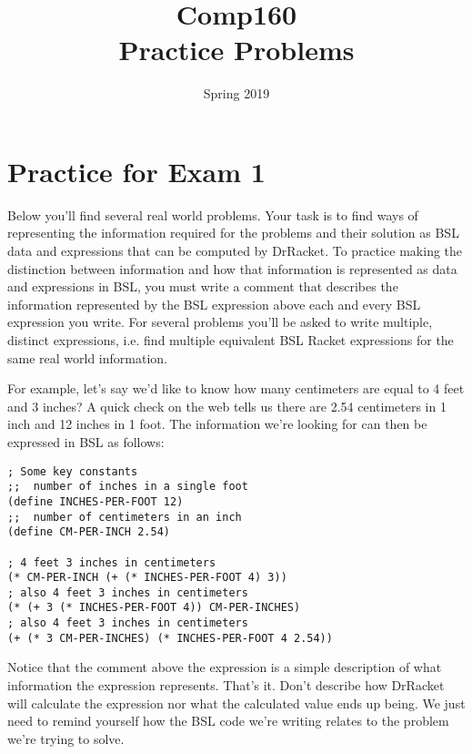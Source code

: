 \documentclass[nobib]{tufte-handout}
\title{Comp160 \\ Practice Problems }
\author{}
\date{ Spring 2019 }
\begin{document}
\maketitle


\section{Practice for Exam 1}

Below you'll find several real world problems. Your task is to find ways of representing the information required for the problems and their solution as BSL data and expressions that can be computed by DrRacket. To practice making the distinction between information and how that information is represented as data and expressions in BSL, you must write a comment that describes the information represented by the BSL expression above each and every BSL expression you write.  For several problems you'll be asked to write multiple, distinct expressions, i.e. find multiple equivalent BSL Racket expressions for the same real world information.

For example, let's say we'd like to know how many centimeters are equal to 4 feet and 3 inches?  A quick check on the web tells us there are 2.54 centimeters in 1 inch and 12 inches in 1 foot.  The information we're looking for can then be expressed in BSL as follows:

\begin{lstlisting}
; Some key constants
;;  number of inches in a single foot
(define INCHES-PER-FOOT 12)
;;  number of centimeters in an inch
(define CM-PER-INCH 2.54)

; 4 feet 3 inches in centimeters
(* CM-PER-INCH (+ (* INCHES-PER-FOOT 4) 3))
; also 4 feet 3 inches in centimeters
(* (+ 3 (* INCHES-PER-FOOT 4)) CM-PER-INCHES)
; also 4 feet 3 inches in centimeters
(+ (* 3 CM-PER-INCHES) (* INCHES-PER-FOOT 4 2.54))
\end{lstlisting}

Notice that the comment above the expression is a simple description of what information the expression represents.  That's it. Don't describe how DrRacket will calculate the expression nor what the calculated value ends up being. We just need to remind yourself how the BSL code we're writing relates to the problem we're trying to solve.
\end{document}
